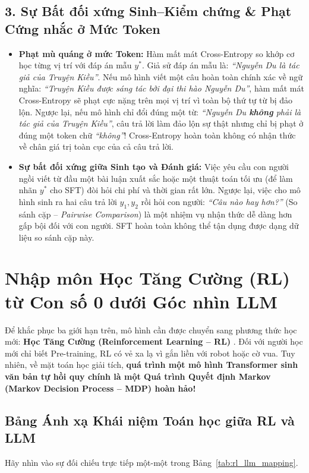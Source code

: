 \subsection{3. Sự Bất đối xứng Sinh--Kiểm chứng \& Phạt Cứng nhắc ở Mức Token}
\begin{itemize}[leftmargin=1.2cm]
    \item \textbf{Phạt mù quáng ở mức Token:} Hàm mất mát Cross-Entropy so khớp cơ học từng vị trí với đáp án mẫu $y^*$. Giả sử đáp án mẫu là: \textit{``Nguyễn Du là tác giả của Truyện Kiều''}. Nếu mô hình viết một câu hoàn toàn chính xác về ngữ nghĩa: \textit{``Truyện Kiều được sáng tác bởi đại thi hào Nguyễn Du''}, hàm mất mát Cross-Entropy sẽ phạt cực nặng trên mọi vị trí vì toàn bộ thứ tự từ bị đảo lộn. Ngược lại, nếu mô hình chỉ đổi đúng một từ: \textit{``Nguyễn Du \textbf{không} phải là tác giả của Truyện Kiều''}, câu trả lời làm đảo lộn sự thật nhưng chỉ bị phạt ở đúng một token chữ \textit{``không''}! Cross-Entropy hoàn toàn không có nhận thức về chân giá trị toàn cục của cả câu trả lời.
    \item \textbf{Sự bất đối xứng giữa Sinh tạo và Đánh giá:} Việc yêu cầu con người ngồi viết từ đầu một bài luận xuất sắc hoặc một thuật toán tối ưu (để làm nhãn $y^*$ cho SFT) đòi hỏi chi phí và thời gian rất lớn. Ngược lại, việc cho mô hình sinh ra hai câu trả lời $y_1, y_2$ rồi hỏi con người: \textit{``Câu nào hay hơn?''} (So sánh cặp -- \textit{Pairwise Comparison}) là một nhiệm vụ nhận thức dễ dàng hơn gấp bội đối với con người. SFT hoàn toàn không thể tận dụng được dạng dữ liệu so sánh cặp này.
\end{itemize}

\section{Nhập môn Học Tăng Cường (RL) từ Con số 0 dưới Góc nhìn LLM}
\label{sec:rl_foundations_llm}

Để khắc phục ba giới hạn trên, mô hình cần được chuyển sang phương thức học mới: \textbf{Học Tăng Cường (Reinforcement Learning -- RL)} \citep{sutton2018reinforcement}.
Đối với người học mới chỉ biết Pre-training, RL có vẻ xa lạ vì gắn liền với robot hoặc cờ vua. Tuy nhiên, về mặt toán học giải tích, \textbf{quá trình một mô hình Transformer sinh văn bản tự hồi quy chính là một Quá trình Quyết định Markov (Markov Decision Process -- MDP) hoàn hảo!}

\subsection{Bảng Ánh xạ Khái niệm Toán học giữa RL và LLM}
Hãy nhìn vào sự đối chiếu trực tiếp một-một trong Bảng~\ref{tab:rl_llm_mapping}.

